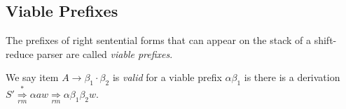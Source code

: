 \documentclass[12pt,a4paper,twoside,openany]{book}
\begin{document}
\subsection{Viable Prefixes}

The prefixes of right sentential forms that can appear on the stack of a shift-reduce parser are called \textit{viable prefixes}.

We say item $A\rightarrow\beta_1\cdot\beta_2$ is \textit{valid} for a viable prefix $\alpha\beta_1$ is there is a derivation $S'\underset{rm}{\overset{*}{\Rightarrow}}\alpha aw\underset{rm}{\Rightarrow}\alpha\beta_1\beta_2w$.

\end{document}
